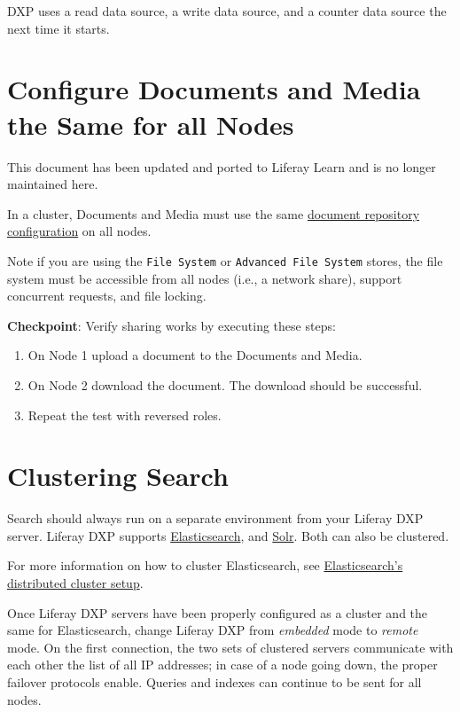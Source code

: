 DXP uses a read data source, a write data source, and a counter data
source the next time it starts.

\chapter{Configure Documents and Media the Same for all
Nodes}\label{configure-documents-and-media-the-same-for-all-nodes}

{This document has been updated and ported to Liferay Learn and is no
longer maintained here.}

In a cluster, Documents and Media must use the same
\href{/docs/7-2/deploy/-/knowledge_base/d/document-repository-configuration}{document
repository configuration} on all nodes.

Note if you are using the \texttt{File\ System} or
\texttt{Advanced\ File\ System} stores, the file system must be
accessible from all nodes (i.e., a network share), support concurrent
requests, and file locking.

\textbf{Checkpoint}: Verify sharing works by executing these steps:

\begin{enumerate}
\def\labelenumi{\arabic{enumi}.}
\item
  On Node 1 upload a document to the Documents and Media.
\item
  On Node 2 download the document. The download should be successful.
\item
  Repeat the test with reversed roles.
\end{enumerate}

\chapter{Clustering Search}\label{clustering-search}

Search should always run on a separate environment from your Liferay DXP
server. Liferay DXP supports
\href{/docs/7-2/deploy/-/knowledge_base/d/installing-elasticsearch}{Elasticsearch},
and \href{/docs/7-2/deploy/-/knowledge_base/d/installing-solr}{Solr}.
Both can also be clustered.

For more information on how to cluster Elasticsearch, see
\href{https://www.elastic.co/guide/en/elasticsearch/guide/current/distributed-cluster.html}{Elasticsearch's
distributed cluster setup}.

Once Liferay DXP servers have been properly configured as a cluster and
the same for Elasticsearch, change Liferay DXP from \emph{embedded} mode
to \emph{remote} mode. On the first connection, the two sets of
clustered servers communicate with each other the list of all IP
addresses; in case of a node going down, the proper failover protocols
enable. Queries and indexes can continue to be sent for all nodes.

